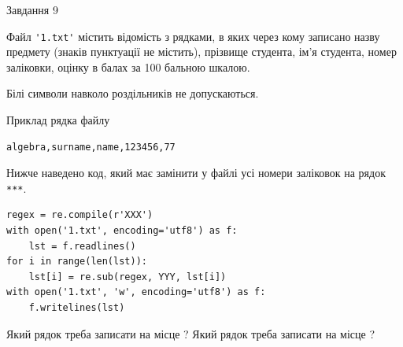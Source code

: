 \documentclass[12pt, ukrainian]{article}
\def\code#1{\Verb!#1!}
\begin{document}
{\begin{minipage}[t]{8.0cm}
\end{minipage}

               
{\begin{center}Завдання {9}\end{center}}
\vspace{-4mm}
Файл \code{'1.txt'} містить відомість з рядками, в яких через кому записа\-но назву предмету (знаків пунктуації не містить), прізвище студента, ім'я студента, номер залі\-ков\-ки, оцінку в балах за 100 бальною шкалою.

Білі символи навколо роздільників не допускаються.

Приклад рядка файлу



\begin{verbatim}
algebra,surname,name,123456,77
\end{verbatim}


Нижче наведено код, який має замінити у файлі усі номери заліковок на рядок \code{***}.



\begin{verbatim}
regex = re.compile(r'XXX')
with open('1.txt', encoding='utf8') as f:
    lst = f.readlines()
for i in range(len(lst)):
    lst[i] = re.sub(regex, YYY, lst[i])
with open('1.txt', 'w', encoding='utf8') as f:
    f.writelines(lst)
\end{verbatim}





Який рядок треба записати на місце  ?
Який рядок треба записати на місце  ?\par

}
\end{document}
